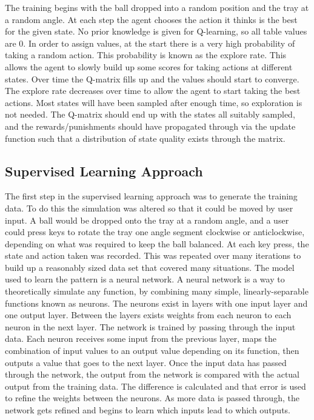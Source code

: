 \documentclass[12pt,a4paper]{article}
\begin{document}
The training begins with the ball dropped into a random position and the tray at a random angle. At each step the agent chooses the action it thinks is the best for the given state. No prior knowledge is given for Q-learning, so all table values are 0. In order to assign values, at the start there is a very high probability of taking a random action. This probability is known as the explore rate. This allows the agent to slowly build up some scores for taking actions at different states. Over time the Q-matrix fills up and the values should start to converge. The explore rate decreases over time to allow the agent to start taking the best actions. Most states will have been sampled after enough time, so exploration is not needed. The Q-matrix should end up with the states all suitably sampled, and the rewards/punishments should have propagated through via the update function such that a distribution of state quality exists through the matrix. 
\subsection{Supervised Learning Approach}
The first step in the supervised learning approach was to generate the training data. To do this the simulation was altered so that it could be moved by user input. A ball would be dropped onto the tray at a random angle, and a user could press keys to rotate the tray one angle segment clockwise or anticlockwise, depending on what was required to keep the ball balanced. At each key press, the state and action taken was recorded. This was repeated over many iterations to build up a reasonably sized data set that covered many situations. 
The model used to learn the pattern is a neural network. A neural network is a way to theoretically simulate any function, by combining many simple, linearly-separable functions known as neurons. The neurons exist in layers with one input layer and one output layer. Between the layers exists weights from each neuron to each neuron in the next layer. The network is trained by passing through the input data. Each neuron receives some input from the previous layer, maps the combination of input values to an output value depending on its function, then outputs a value that goes to the next layer. Once the input data has passed through the network, the output from the network is compared with the actual output from the training data. The difference is calculated and that error is used to refine the weights between the neurons. As more data is passed through, the network gets refined and begins to learn which inputs lead to which outputs.
\end{document}
